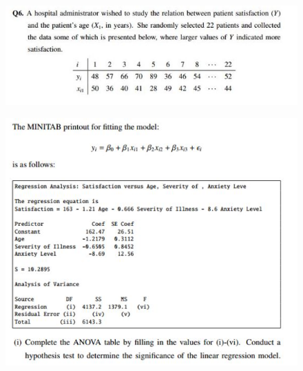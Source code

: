 \documentclass[a4paper,12pt]{article}
\begin{document}
\begin{figure}[h!]
\centering
\includegraphics[width=0.9\linewidth]{images/RegressionANOVA-Question-minitab}

\end{figure}
\begin{figure}[h!]
\centering
\includegraphics[width=0.9\linewidth]{images/RegressionANOVA-minitab}

\end{figure}


\newpage
\end{document}
